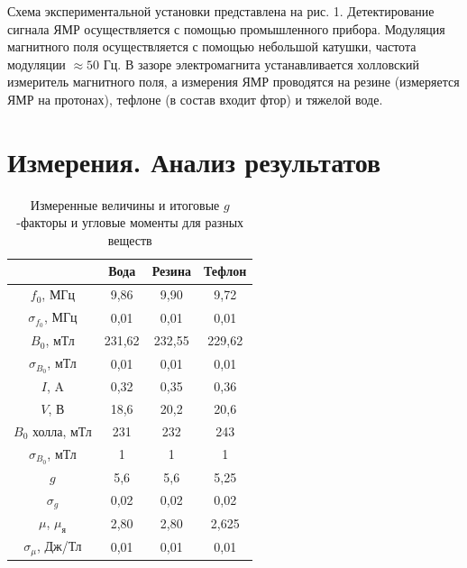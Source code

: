 \documentclass[a4paper, 12pt]{article}%
\begin{document}
Схема экспериментальной установки представлена на рис. 1. Детектирование сигнала ЯМР осуществляется с помощью промышленного прибора. Модуляция магнитного поля осуществляется с помощью небольшой катушки, частота модуляции $\approx 50$ Гц. В зазоре электромагнита устанавливается холловский измеритель магнитного поля, а измерения ЯМР проводятся на резине (измеряется ЯМР на протонах), тефлоне (в состав входит фтор) и тяжелой воде.
\section{Измерения. Анализ результатов}
\begin{table}[h]
\begin{center}
\begin{tabular}{|c|c|c|c|}
\hline
                      & Вода   & Резина & Тефлон \\ \hline
$f_0$, МГц            & 9,86   & 9,90   & 9,72   \\ \hline
$\sigma_{f_0}$, МГц   & 0,01   & 0,01   & 0,01   \\ \hline
$B_0$, мТл            & 231,62 & 232,55 & 229,62 \\ \hline
$\sigma_{B_0}$, мТл   & 0,01   & 0,01   & 0,01   \\ \hline
$I$, A                & 0,32   & 0,35   & 0,36   \\ \hline
$V$, В                & 18,6   & 20,2   & 20,6   \\ \hline
$B_0$ холла, мТл    & 231    & 232    & 243    \\ \hline
$\sigma_{B_0}$, мТл   & 1      & 1      & 1      \\ \hline
$g$                   & 5,6    & 5,6    & 5,25   \\ \hline
$\sigma_g$            & 0,02   & 0,02   & 0,02   \\ \hline
$\mu$, $\mu_{\text{я}}$        & 2,80   & 2,80   & 2,625  \\ \hline
$\sigma_{\mu}$, Дж/Тл & 0,01   & 0,01   & 0,01   \\ \hline
\end{tabular}
\caption{Измеренные величины и итоговые $g$-факторы и угловые моменты для разных веществ}
\end{center}
\end{table}
\end{document}
